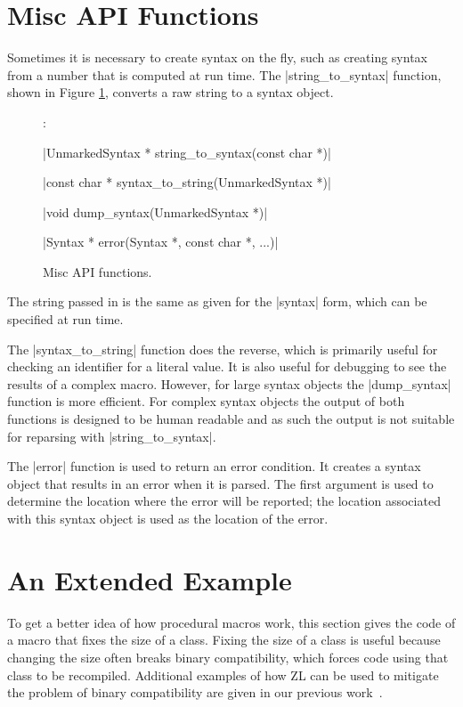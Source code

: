 \section{Misc API Functions}

Sometimes it is necessary to create syntax on the fly, such as
creating syntax from a number that is computed at run time.  The
|string_to_syntax| function, shown in Figure \ref{misc-api}, converts
a raw string to a syntax object.
\begin{figure}
\begin{apil}
\item {}:
\begin{apill}
\item |UnmarkedSyntax * string_to_syntax(const char *)|
\item |const char * syntax_to_string(UnmarkedSyntax *)|
\item |void dump_syntax(UnmarkedSyntax *)|
\item |Syntax * error(Syntax *, const char *, ...)|
\end{apill}
\end{apil}
\caption{Misc API functions.}
\label{misc-api}
\end{figure}
The string passed in is the same as given for the |syntax| form, which
can be specified at run time.

The |syntax_to_string| function does the reverse, which is primarily
useful for checking an identifier for a literal value.  It is also
useful for debugging to see the results of a complex macro.  However,
for large syntax objects the |dump_syntax| function is more efficient.
For complex syntax objects the output of both functions is designed to
be human readable and as such the output is not suitable for reparsing
with |string_to_syntax|.

The |error| function is used to return an error condition.  It
creates a syntax object that results in an error when it is
parsed.  The first argument is used to determine the location where
the error will be reported; the location associated with this syntax
object is used as the location of the error.

\section{An Extended Example}

\label{fix_size}

To get a better idea of how procedural macros work, this section gives
the code of a macro that fixes the size of a class.  Fixing the size
of a class is useful because changing the size often breaks
binary compatibility, which forces code using that class to be
recompiled.  Additional examples of how ZL can be used to mitigate the
problem of binary compatibility are given in our previous
work~\cite{abi-gpce10}.

